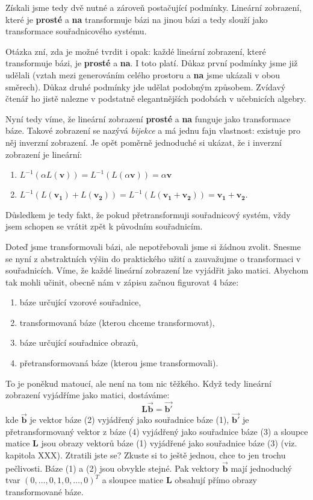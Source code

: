 \documentclass[a5paper,12pt]{amsbook}
\theoremstyle{definition}
\newcommand{\myscalar}[1]{#1}
\newcommand{\myvec}[1]{\mathbf{#1}}
\newcommand{\mycoord}[1]{\overrightarrow{\mathbf{#1}}}
\newcommand{\mymatrix}[1]{\mathbf{#1}}
\newcommand{\mymap}[1]{#1}
\begin{document}
Získali jsme tedy dvě nutné a zároveň postačující podmínky. Lineární zobrazení, které 
je \textbf{prosté} a \textbf{na} transformuje bázi na jinou bázi a tedy slouží jako transformace
souřadnicového systému.

Otázka zní, zda je možné tvrdit i opak: každé lineární zobrazení, které transformuje bázi,
je \textbf{prosté} a \textbf{na}. I toto platí. Důkaz první podmínky jsme již udělali (vztah
mezi generováním celého prostoru a \textbf{na} jsme ukázali v obou směrech). Důkaz
druhé podmínky jde udělat podobným způsobem. Zvídavý čtenář ho jistě nalezne v podstatně
elegantnějších podobách v učebnicích algebry.

Nyní tedy víme, že lineární zobrazení \textbf{prosté} a \textbf{na} funguje jako transformace
báze. Takové zobrazení se nazývá \textit{bijekce} a má jednu fajn vlastnost: existuje pro něj
inverzní zobrazení. Je opět poměrně jednoduché si ukázat, že i inverzní zobrazení je lineární:
\begin{enumerate}
  \item $\mymap{L}^{-1}(\myscalar{\alpha}\mymap{L}(\myvec{v})) 
      = \mymap{L^{-1}}(\mymap{L}(\myscalar{\alpha}\myvec{v})) = \myscalar{\alpha}\myvec{v}$
  \item $\mymap{L}^{-1}(\mymap{L}(\myvec{v_1}) + \mymap{L}(\myvec{v_2}))
      = \mymap{L}^{-1}(\mymap{L}(\myvec{v_1} + \myvec{v_2}))
      = \myvec{v_1} + \myvec{v_2}$.
\end{enumerate}
Důsledkem je tedy fakt, že pokud přetransformuji souřadnicový systém, vždy jsem schopen
se vrátit zpět k původním souřadnicím.

Doteď jsme transformovali bázi, ale nepotřebovali jsme si žádnou zvolit. Snesme se nyní
z abstraktních výšin do praktického užití a zauvažujme o transformaci v souřadnicích.
Víme, že každé lineární zobrazení lze vyjádřit jako matici. Abychom tak mohli učinit,
obecně nám v zápisu začnou figurovat 4 báze:
\begin{enumerate}
  \item báze určující vzorové souřadnice,
  \item transformovaná báze (kterou chceme transformovat),
  \item báze určující souřadnice obrazů,
  \item přetransformovaná báze (kterou jsme transformovali).
\end{enumerate}
To je poněkud matoucí, ale není na tom nic těžkého. Když tedy lineární zobrazení vyjádříme
jako matici, dostáváme:
\begin{equation*}
\mymatrix{L}\mycoord{b} = \mycoord{b'}
\end{equation*}
kde $\mycoord{b}$ je vektor báze (2) vyjádřený jako souřadnice báze (1), $\mycoord{b'}$ je
přetransformovaný vektor z báze (4) vyjádřený jako souřadnice báze (3) a sloupce matice
$\mymatrix{L}$ jsou obrazy vektorů báze (1) vyjádřené jako souřadnice báze (3) (viz. kapitola
XXX). Ztratili jste se? Zkuste si to ještě jednou, chce to jen trochu pečlivosti. Báze
(1) a (2) jsou obvykle stejné. Pak vektory $\mycoord{b}$ mají jednoduchý tvar 
$(0, \ldots, 0, 1, 0, \ldots, 0)^T$ a sloupce matice $\mymatrix{L}$ obsahují přímo obrazy
transformované báze.
\end{document}
